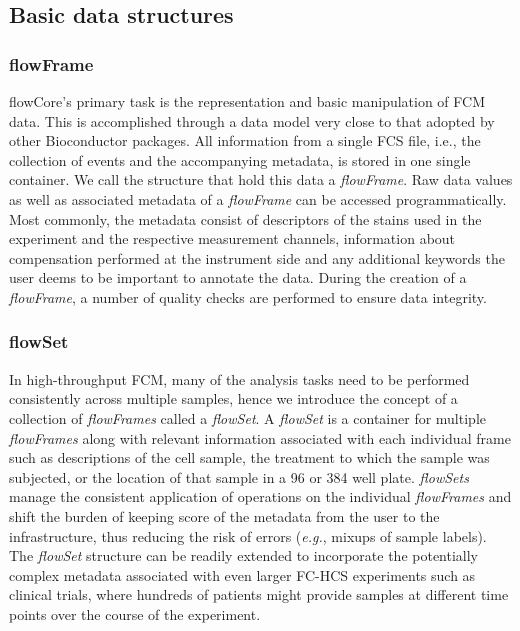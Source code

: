 \documentclass[12pt]{article}
\newcommand{\Rpackage}[1]{{\textsf{#1}}}
\newcommand{\Rclass}[1]{{\textit{#1}}}
\begin{document}
\subsection*{Basic data structures}
\subsubsection*{flowFrame}

\Rpackage{flowCore}'s primary task is the representation and basic
manipulation of FCM data. This is accomplished through a data model
very close to that adopted by other Bioconductor packages. All
information from a single FCS file, i.e., the collection of events and
the accompanying metadata, is stored in one single container. We call
the structure that hold this data a \Rclass{flowFrame}. Raw data
values as well as associated metadata of a \Rclass{flowFrame} can be
accessed programmatically. Most commonly, the metadata consist of
descriptors of the stains used in the experiment and the respective
measurement channels, information about compensation performed at the
instrument side and any additional keywords the user deems to be
important to annotate the data. During the creation of a
\Rclass{flowFrame}, a number of quality checks are performed to ensure
data integrity.

\subsubsection*{flowSet}
In high-throughput FCM, many of the analysis tasks need to be
performed consistently across multiple samples, hence we introduce the
concept of a collection of \Rclass{flowFrames} called a
\Rclass{flowSet}. A \Rclass{flowSet} is a container for multiple
\Rclass{flowFrames} along with relevant information associated with
each individual frame such as descriptions of the cell sample, the
treatment to which the sample was subjected, or the location of that
sample in a 96 or 384 well plate.  \Rclass{flowSets} manage the
consistent application of operations on the individual
\Rclass{flowFrames} and shift the burden of keeping score of the
metadata from the user to the infrastructure, thus reducing the risk
of errors (\textit{e.g.}, mixups of sample labels). The
\Rclass{flowSet} structure can be readily extended to incorporate the
potentially complex metadata associated with even larger FC-HCS
experiments such as clinical trials, where hundreds of patients might
provide samples at different time points over the course of the
experiment.
\end{document}
